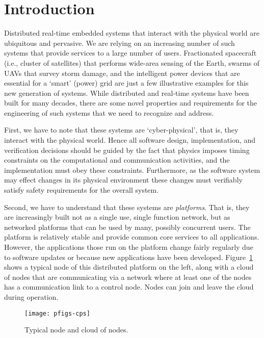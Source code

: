 \section{Introduction}
\label{sec:intro}

Distributed real-time embedded systems that interact with the physical
world are ubiquitous and pervasive. We are relying on an increasing
number of such systems that provide services to a large number of
users. Fractionated spacecraft (i.e., cluster of satellites)
that performs wide-area sensing of the Earth, swarms of UAVs that
survey storm damage, and the intelligent power devices that are
essential for a `smart' (power) grid are just a few illustrative
examples for this new generation of systems. While distributed and
real-time systems have been built for many decades, there are some
novel properties and requirements for the engineering of such systems
that we need to recognize and address.

First, we have to note that these systems are `cyber-physical', that is,
they interact with the physical world. Hence all software design,
implementation, and verification decisions should be guided by the fact
that physics imposes timing constraints on the computational and
communication activities, and the implementation must obey these
constraints. Furthermore, as the software system may effect changes in
its physical environment these changes must verifiably satisfy safety
requirements for the overall system.

Second, we have to understand that these systems are 
\textit{platforms}. That is, they are increasingly built not as a
single use, single function network, but as networked platforms that
can be used by many, possibly concurrent users. The platform is
relatively stable and provide common core services to all applications. 
However,  the applications those run on the platform
change fairly regularly due to software updates or because new applications
have been developed. 
Figure~\ref{fig:cloud_cps} shows a typical node of this
distributed platform on the left, along with a cloud of nodes that are
communicating via a network where at least one of the nodes has a
communication link to a control node. Nodes can join and leave the cloud 
during operation.

\begin{figure}[ht]
\centering
\texttt{[image: pfigs-cps]}
\caption{Typical node and cloud of nodes.}
\label{fig:cloud_cps}
\end{figure}


